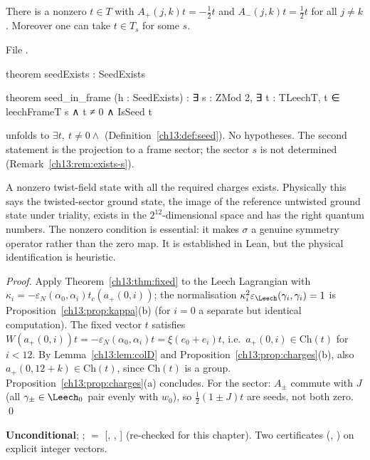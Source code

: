 \begin{theorem}\label{ch13:thm:seed}
There is a nonzero $t\in T$ with $A_+(j,k)t=-\tfrac12t$ and $A_-(j,k)t=\tfrac12t$ for all $j\ne k$.
Moreover one can take $t\in T_s$ for some $s$.
\end{theorem}
\noindent File .
\begin{leancode}
theorem seedExists : SeedExists

theorem seed_in_frame (h : SeedExists) :
    ∃ s : ZMod 2, ∃ t : TLeechT, t ∈ leechFrameT s ∧ t ≠ 0 ∧ IsSeed t
\end{leancode}
\begin{dictionary}
 unfolds to $\exists t,\ t\ne0\wedge$ (Definition~\ref{ch13:def:seed}). No
hypotheses. The second statement is the projection to a frame sector; the sector $s$ is not determined
(Remark~\ref{ch13:rem:exists-s}).
\end{dictionary}
\begin{physics}
A nonzero twist-field state with all the required charges exists. Physically this says the twisted-sector ground state, the image of the reference untwisted ground state under triality, exists in the $2^{12}$-dimensional space and has the right quantum numbers. The nonzero condition is essential: it makes $\sigma$ a genuine symmetry operator rather than the zero map. It is established in Lean, but the physical identification is heuristic.
\end{physics}
\noindent\emph{Proof.} Apply Theorem~\ref{ch13:thm:fixed} to the Leech Lagrangian with
$\kappa_i=-\varepsilon_N(\alpha_0,\alpha_i)t_c(a_+(0,i))$; the normalisation $\kappa_i^2\varepsilon_\Leech(\gamma_i,\gamma_i)=1$ is
Proposition~\ref{ch13:prop:kappa}(b) (for $i=0$ a separate but identical computation). The fixed vector
$t$ satisfies $W(a_+(0,i))t=-\varepsilon_N(\alpha_0,\alpha_i)t=\xi(e_0+e_i)t$, i.e.\ $a_+(0,i)\in\mathrm{Ch}(t)$ for $i<12$. By
Lemma~\ref{ch13:lem:colD} and Proposition~\ref{ch13:prop:charges}(b), also $a_+(0,12+k)\in\mathrm{Ch}(t)$, since
$\mathrm{Ch}(t)$ is a group. Proposition~\ref{ch13:prop:charges}(a) concludes. For the sector: $A_\pm$ commute
with $J$ (all $\gamma_\pm\in\Leech_0$ pair evenly with $w_0$), so $\tfrac12(1\pm J)t$ are seeds, not both zero. \qed
\begin{status}
\textbf{Unconditional}; ;  $=$
[, , ] (re-checked for this chapter). Two
 certificates (, ) on explicit integer vectors.
\end{status}

